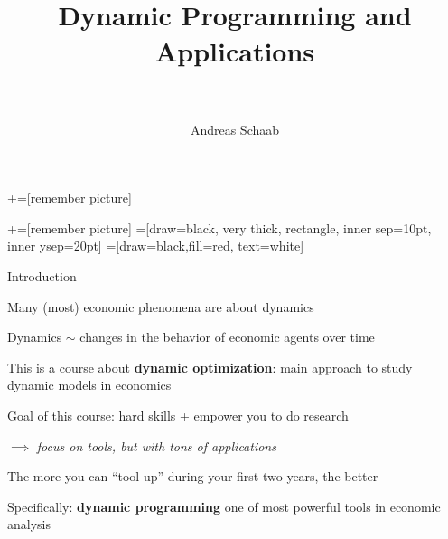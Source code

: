 \documentclass[11pt, aspectratio=169]{beamer}
\title[]{\\[8pt]
	{\large \color{blue} Dynamic Programming and Applications \\[5pt] \normalfont{Discrete Time Dynamics and Optimization} \\[10pt] \normalfont{Lecture 1}}}
\author[Schaab]{Andreas Schaab}
\institute{}
\date{}
\newenvironment{witemize}{\itemize\addtolength{\itemsep}{10pt}}{\enditemize}
\begin{document}
+=[remember picture]

\newcommand\marktopleft[1]{%
	\tikz[overlay,remember picture] 
	\node (marker-#1-a) at (-.3em,.3em) {};%
}
\newcommand\markbottomright[2]{%
	\tikz[overlay,remember picture] 
	\node (marker-#1-b) at (0em,0em) {};%
}
+=[remember picture] 
 =[draw=black, very thick, rectangle, inner sep=10pt, inner ysep=20pt]
 =[draw=black,fill=red, text=white]


\addtocounter{framenumber}{-1}
\thispagestyle{empty}
\maketitle 
\newpage


\begin{frame}{Introduction}
\begin{witemize}
\item Many (most) economic phenomena are about dynamics

\item Dynamics $\sim$ changes in the behavior of economic agents over time

\item This is a course about \textbf{dynamic optimization}: main approach to study dynamic models in economics 

\item Goal of this course: hard skills + empower you to do research

$\implies$ \textit{focus on tools, but with tons of applications }

\item The more you can ``tool up'' during your first two years, the better

\item Specifically: \textbf{dynamic programming} one of most powerful tools in economic analysis

\end{witemize}
\end{frame}
\end{document}
